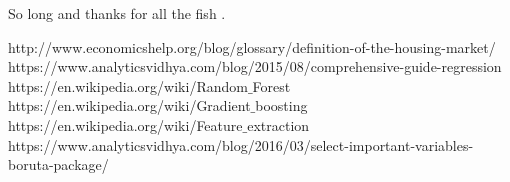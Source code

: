\documentclass[fleqn,10pt]{SelfArx} %
\begin{document}

So long and thanks for all the fish \cite{Figueredo:2009dg}.

http://www.economicshelp.org/blog/glossary/definition-of-the-housing-market/
\newline [2]https://www.analyticsvidhya.com/blog/2015/08/comprehensive-guide-regression
\newline [3]https://en.wikipedia.org/wiki/Random$\_$Forest
\newline [4]https://en.wikipedia.org/wiki/Gradient$\_$boosting
\newline [5]https://en.wikipedia.org/wiki/Feature$\_$extraction
\newline [6]https://www.analyticsvidhya.com/blog/2016/03/select-important-variables-boruta-package/



\end{document}
